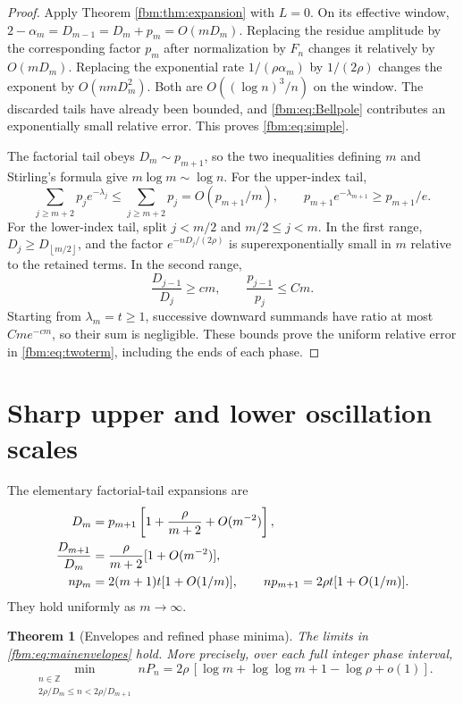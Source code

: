 \documentclass[11pt]{article}
\newtheorem{theorem}{Theorem}[section]
\theoremstyle{remark}\newtheorem{remark}[theorem]{Remark}
\newcommand{\floor}[1]{\left\lfloor #1\right\rfloor}
\begin{document}
\begin{proof}
Apply Theorem \ref{fbm:thm:expansion} with $L=0$. On its effective window,
$2-\alpha_m=D_{m-1}=D_m+p_m=O(mD_m)$. Replacing the residue amplitude by the corresponding factor $p_m$ after normalization by $F_n$ changes it relatively by $O(mD_m)$. Replacing the exponential rate $1/(\rho\alpha_m)$ by $1/(2\rho)$ changes the exponent by $O(nmD_m^2)$. Both are $O((\log n)^3/n)$ on the window. The discarded tails have already been bounded, and \eqref{fbm:eq:Bellpole} contributes an exponentially small relative error. This proves \eqref{fbm:eq:simple}.

The factorial tail obeys $D_m\sim p_{m+1}$, so the two inequalities defining $m$ and Stirling's formula give $m\log m\sim\log n$.
For the upper-index tail,
\[
 \sum_{j\geq m+2}p_je^{-\lambda_j}\leq\sum_{j\geq m+2}p_j
       =O(p_{m+1}/m),
 \qquad p_{m+1}e^{-\lambda_{m+1}}\geq p_{m+1}/e.
\]
For the lower-index tail, split $j<m/2$ and $m/2\leq j<m$. In the first range, $D_j\geq D_{\floor{m/2}}$, and the factor $e^{-nD_j/(2\rho)}$ is superexponentially small in $m$ relative to the retained terms. In the second range,
\[
 \frac{D_{j-1}}{D_j}\geq cm,\qquad \frac{p_{j-1}}{p_j}\leq Cm.
\]
Starting from $\lambda_m=t\geq1$, successive downward summands have ratio at most $Cm e^{-cm}$, so their sum is negligible. These bounds prove the uniform relative error in \eqref{fbm:eq:twoterm}, including the ends of each phase.
\end{proof}

\section{Sharp upper and lower oscillation scales}\label{fbm:sec:envelopes}
The elementary factorial-tail expansions are
\begin{align}
 D_m&=p_{m+1}\left[1+\frac{\rho}{m+2}+O(m^{-2})\right],\label{fbm:eq:tailratio}\\
 \frac{D_{m+1}}{D_m}&=\frac{\rho}{m+2}[1+O(m^{-2})],\notag\\
 np_m&=2(m+1)t[1+O(1/m)],\qquad
 np_{m+1}=2\rho t[1+O(1/m)].\notag
\end{align}
They hold uniformly as $m\to\infty$.

\begin{theorem}[Envelopes and refined phase minima]\label{fbm:thm:envelopes}
The limits in \eqref{fbm:eq:mainenvelopes} hold. More precisely, over each full integer phase interval,
\begin{equation}\label{fbm:eq:minimum}
 \min_{\substack{n\in\mathbb Z\\2\rho/D_m\leq n<2\rho/D_{m+1}}}nP_n
 =2\rho\,[\log m+\log\log m+1-\log\rho+o(1)].
\end{equation}
\end{theorem}
\end{document}
